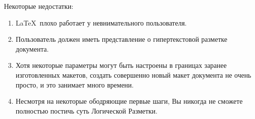 Некоторые недостатки:
\begin{enumerate}
  \item \LaTeX\ плохо работает у невнимательного пользователя.
  \item Пользователь должен иметь представление о гипертекстовой разметке документа.
  \item Хотя некоторые параметры могут быть настроены в границах заранее изготовленных макетов, создать совершенно новый макет документа не очень просто, и это занимает много времени. 
  \item Несмотря на некоторые ободряющие первые шаги, Вы никогда не сможете полностью постичь суть Логической Разметки. 
\end{enumerate}















